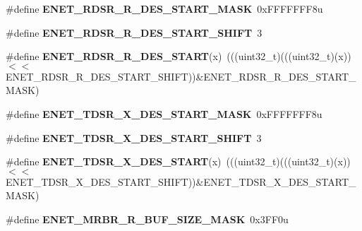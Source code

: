 \begin{DoxyCompactItemize}
\item 
\#define {\bfseries E\+N\+E\+T\+\_\+\+R\+D\+S\+R\+\_\+\+R\+\_\+\+D\+E\+S\+\_\+\+S\+T\+A\+R\+T\+\_\+\+M\+A\+SK}~0x\+F\+F\+F\+F\+F\+F\+F8u\hypertarget{group__ENET__Register__Masks_gab49b1d2ba8d51579828593849f9f9f0d}{}\label{group__ENET__Register__Masks_gab49b1d2ba8d51579828593849f9f9f0d}

\item 
\#define {\bfseries E\+N\+E\+T\+\_\+\+R\+D\+S\+R\+\_\+\+R\+\_\+\+D\+E\+S\+\_\+\+S\+T\+A\+R\+T\+\_\+\+S\+H\+I\+FT}~3\hypertarget{group__ENET__Register__Masks_ga1afaef178575034556d8e580d5fe0c84}{}\label{group__ENET__Register__Masks_ga1afaef178575034556d8e580d5fe0c84}

\item 
\#define {\bfseries E\+N\+E\+T\+\_\+\+R\+D\+S\+R\+\_\+\+R\+\_\+\+D\+E\+S\+\_\+\+S\+T\+A\+RT}(x)~(((uint32\+\_\+t)(((uint32\+\_\+t)(x))$<$$<$E\+N\+E\+T\+\_\+\+R\+D\+S\+R\+\_\+\+R\+\_\+\+D\+E\+S\+\_\+\+S\+T\+A\+R\+T\+\_\+\+S\+H\+I\+FT))\&E\+N\+E\+T\+\_\+\+R\+D\+S\+R\+\_\+\+R\+\_\+\+D\+E\+S\+\_\+\+S\+T\+A\+R\+T\+\_\+\+M\+A\+SK)\hypertarget{group__ENET__Register__Masks_ga49d871cbe8f6320beb777362b427fea6}{}\label{group__ENET__Register__Masks_ga49d871cbe8f6320beb777362b427fea6}

\item 
\#define {\bfseries E\+N\+E\+T\+\_\+\+T\+D\+S\+R\+\_\+\+X\+\_\+\+D\+E\+S\+\_\+\+S\+T\+A\+R\+T\+\_\+\+M\+A\+SK}~0x\+F\+F\+F\+F\+F\+F\+F8u\hypertarget{group__ENET__Register__Masks_ga0fd3699cfea6036741e57fde2c14259b}{}\label{group__ENET__Register__Masks_ga0fd3699cfea6036741e57fde2c14259b}

\item 
\#define {\bfseries E\+N\+E\+T\+\_\+\+T\+D\+S\+R\+\_\+\+X\+\_\+\+D\+E\+S\+\_\+\+S\+T\+A\+R\+T\+\_\+\+S\+H\+I\+FT}~3\hypertarget{group__ENET__Register__Masks_ga46f0734fb316af30bafaaaf1f33cc24a}{}\label{group__ENET__Register__Masks_ga46f0734fb316af30bafaaaf1f33cc24a}

\item 
\#define {\bfseries E\+N\+E\+T\+\_\+\+T\+D\+S\+R\+\_\+\+X\+\_\+\+D\+E\+S\+\_\+\+S\+T\+A\+RT}(x)~(((uint32\+\_\+t)(((uint32\+\_\+t)(x))$<$$<$E\+N\+E\+T\+\_\+\+T\+D\+S\+R\+\_\+\+X\+\_\+\+D\+E\+S\+\_\+\+S\+T\+A\+R\+T\+\_\+\+S\+H\+I\+FT))\&E\+N\+E\+T\+\_\+\+T\+D\+S\+R\+\_\+\+X\+\_\+\+D\+E\+S\+\_\+\+S\+T\+A\+R\+T\+\_\+\+M\+A\+SK)\hypertarget{group__ENET__Register__Masks_ga53841baf2c5ce76e02763f85cb9bca43}{}\label{group__ENET__Register__Masks_ga53841baf2c5ce76e02763f85cb9bca43}

\item 
\#define {\bfseries E\+N\+E\+T\+\_\+\+M\+R\+B\+R\+\_\+\+R\+\_\+\+B\+U\+F\+\_\+\+S\+I\+Z\+E\+\_\+\+M\+A\+SK}~0x3\+F\+F0u\hypertarget{group__ENET__Register__Masks_ga376edb2860d9c55545ca78616f7d81f3}{}\label{group__ENET__Register__Masks_ga376edb2860d9c55545ca78616f7d81f3}


\end{DoxyCompactItemize}
